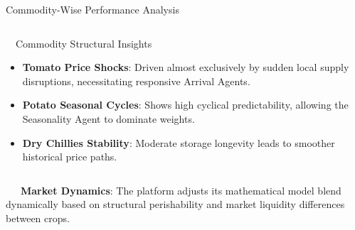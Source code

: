 \documentclass{beamer}
\begin{document}
\begin{frame}{Commodity-Wise Performance Analysis}
\begin{columns}[T]
    \begin{column}{0.48\textwidth}
        \begin{orangecard}[height=5.2cm]{~~Commodity Structural Insights}
            \fontsize{6.8pt}{8.2pt}\selectfont
            \begin{itemize}\setlength\itemsep{4.5pt}\setlength\parskip{0pt}
                \item \textbf{Tomato Price Shocks}: Driven almost exclusively by sudden local supply disruptions, necessitating responsive Arrival Agents.
                \item \textbf{Potato Seasonal Cycles}: Shows high cyclical predictability, allowing the Seasonality Agent to dominate weights.
                \item \textbf{Dry Chillies Stability}: Moderate storage longevity leads to smoother historical price paths.
            \end{itemize}
        \end{orangecard}
    \end{column}
\end{columns}

\vspace{0.15cm}
\begin{tcolorbox}[enhanced, colback=primaryblue!4, colframe=primaryblue!30, boxrule=0.35pt,
  arc=3.5pt, width=0.98\textwidth, left=4pt, right=4pt, top=2.5pt, bottom=2.5pt, boxsep=0pt,
  halign=center, shadow={0.5pt}{-0.5pt}{0pt}{black!8}]
    \fontsize{5.5pt}{6.5pt}\selectfont
    \textcolor{primaryDark}{~~~\textbf{Market Dynamics}: The platform adjusts its mathematical model blend dynamically based on structural perishability and market liquidity differences between crops.}
\end{tcolorbox}
\end{frame}
\end{document}
